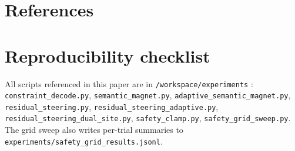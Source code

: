 \documentclass{article}
\begin{document}
\section*{References}



\appendix

\section{Reproducibility checklist}
All scripts referenced in this paper are in \texttt{/workspace/experiments} \citep{thiswork2026}:
\texttt{constraint\_decode.py},
\texttt{semantic\_magnet.py},
\texttt{adaptive\_semantic\_magnet.py},
\texttt{residual\_steering.py},
\texttt{residual\_steering\_adaptive.py},
\texttt{residual\_steering\_dual\_site.py},
\texttt{safety\_clamp.py},
\texttt{safety\_grid\_sweep.py}.
The grid sweep also writes per-trial summaries to \texttt{experiments/safety\_grid\_results.jsonl}.
\end{document}
